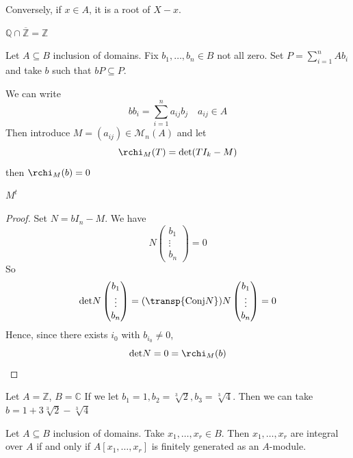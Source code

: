 Conversely, if \(x \in  A\), it is a root of \(X - x\).

\begin{corollary}{}
    \(\mathbb{Q} \cap \overline{\mathbb{Z}} = \mathbb{Z}\) 
\end{corollary}

\begin{proposition}{}
    Let \(A \subseteq B \) inclusion of domains. Fix \(b_{1}, \dots, b_{n} \in
    B\) not all zero. Set \(P = \sum_{i=1}^{n} A b_{i} \) and take \(b\) such
    that \(bP \subseteq P \).

    We can write
    \[
      b b_{i} = \sum_{i=1}^{n} a_{ij} b_{j} \quad a_{ij} \in A
    \]
    Then introduce \(M = {(a_{ij})} \in \mathcal{M}_n{(A)}\) and let 
    \[
      \rchi_{M} {(T)} = \mathrm{det}{(TI_k - M)}
    \]
    then \(\rchi_M {(b)} = 0\) 
\end{proposition}
\begin{remark}{}
    \(M^{t} \) 
\end{remark}

\begin{proof}{}
    Set \(N = bI_n - M\). We have
    \[
      N \begin{pmatrix}
          b_{1} \\
          \vdots \\
          b_n
      \end{pmatrix} = 0
    \]
    So
    \[
      \mathrm{det} N \begin{pmatrix}
          b_{1} \\
          \vdots \\
          b_n
          \end{pmatrix} = {(\transp{\mathrm{Conj}N})} N \begin{pmatrix}
          b_{1} \\
          \vdots \\
          b_n
      \end{pmatrix} = 0
    \]
    Hence, since there exists \(i_{0}\) with \(b_{i_{0}} \neq 0\), 
    \[
      \mathrm{det}N = 0 = \rchi_M{(b)}
    \]
\end{proof}

\begin{example}{}
    Let \(A = \mathbb{Z}\), \(B = \mathbb{C}\) 
    If we let \(b_{1} = 1, b_{2} = \sqrt[3]{2}, b_{3} = \sqrt[3]{4}\). Then we
    can take \(b = 1 + 3 \sqrt[3]{2} - \sqrt[3]{4}\) 
\end{example}

\begin{corollary}{}
    Let \(A \subseteq B \) inclusion of domains. Take \(x_{1}, \dots, x_{r} \in
    B\). Then \(x_{1}, \dots, x_r\) are integral over \(A\) if and only if
    \(A[x_{1}, \dots, x_r]\) is finitely generated as an \(A\)-module.
\end{corollary}

